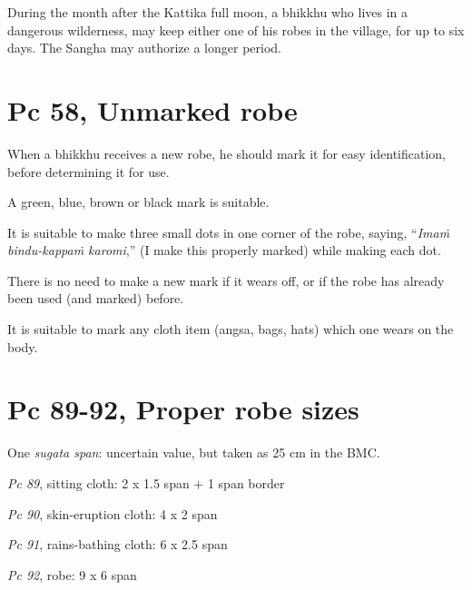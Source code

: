During the month after the Kattika full moon, a bhikkhu who lives in a
dangerous wilderness, may keep either one of his robes in the village,
for up to six days. The Sangha may authorize a longer period.

\section{Pc 58, Unmarked robe}

When a bhikkhu receives a new robe, he should mark it for easy
identification, before determining it for use.

A green, blue, brown or black mark is suitable.

It is suitable to make three small dots in one corner of the robe,
saying, ``\emph{Imaṁ bindu-kappaṁ karomi},'' (I make this properly
marked) while making each dot.

There is no need to make a new mark if it wears off, or if the robe has
already been used (and marked) before.

It is suitable to mark any cloth item (angsa, bags, hats) which one
wears on the body.

\section{Pc 89-92, Proper robe sizes}

One \emph{sugata span}: uncertain value, but taken as 25 cm in the BMC.

\emph{Pc 89}, sitting cloth: 2 x 1.5 span + 1 span border

\emph{Pc 90}, skin-eruption cloth: 4 x 2 span

\emph{Pc 91}, rains-bathing cloth: 6 x 2.5 span

\emph{Pc 92}, robe: 9 x 6 span

